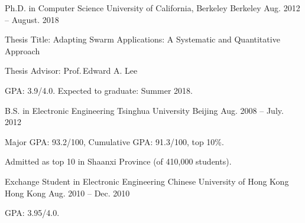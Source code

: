 

\begin{cventries}

  \cventry
  {Ph.D. in Computer Science}
  {University of California, Berkeley}
  {Berkeley}
  {Aug. 2012 -- August. 2018}
  {
    \begin{cvitems}
    \item Thesis Title: Adapting Swarm Applications: A Systematic and
      Quantitative Approach
    \item Thesis Advisor: Prof.\,Edward A. Lee
    \item GPA: 3.9/4.0. Expected to graduate: Summer 2018.
    \end{cvitems}
  }

  \cventry
  {B.S. in Electronic Engineering}
  {Tsinghua University}
  {Beijing}
  {Aug. 2008 -- July. 2012}
  {
    \begin{cvitems}
    \item{Major GPA: 93.2/100, Cumulative GPA: 91.3/100, top 10\%.}
    \item{Admitted as top 10 in Shaanxi Province (of 410,000 students).}
    \end{cvitems}
  }

  \cventry
  {Exchange Student in Electronic Engineering}
  {Chinese University of Hong Kong}
  {Hong Kong}
  {Aug. 2010 -- Dec. 2010}
  {
    \begin{cvitems}
    \item {GPA: 3.95/4.0.}
    \end{cvitems}
  }

\end{cventries}

